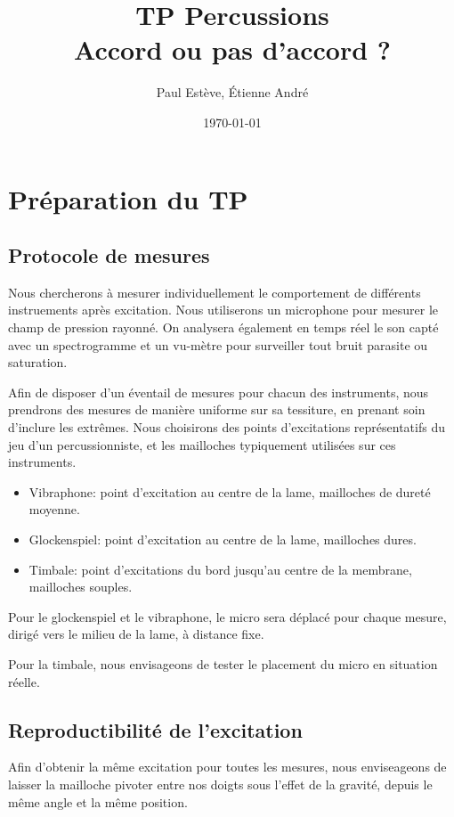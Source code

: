 \documentclass[atiam, article]{rapport} %
\title{TP Percussions\\Accord ou pas d'accord ?}
\author{Paul Estève, Étienne André} %
\date{\today}
\begin{document}
\maketitle

\section{Préparation du TP}

\nocite{chaigne2008acoustique}
\nocite{kinsler2000fundamentals}

\subsection{Protocole de mesures}
Nous chercherons à mesurer individuellement le comportement de différents instruements après excitation. Nous utiliserons un microphone pour mesurer le champ de pression rayonné. On analysera également en temps réel le son capté avec un spectrogramme et un vu-mètre pour surveiller tout bruit parasite ou saturation.

Afin de disposer d'un éventail de mesures pour chacun des instruments, nous prendrons des mesures de manière uniforme sur sa tessiture, en prenant soin d'inclure les extrêmes. Nous choisirons des points d'excitations représentatifs du jeu d'un percussionniste, et les mailloches typiquement utilisées sur ces instruments.

\begin{itemize}
  \item Vibraphone: point d'excitation au centre de la lame, mailloches de dureté moyenne.
  \item Glockenspiel: point d'excitation au centre de la lame, mailloches dures.
  \item Timbale: point d'excitations du bord jusqu'au centre de la membrane, mailloches souples.
\end{itemize}


Pour le glockenspiel et le vibraphone, le micro sera déplacé pour chaque mesure, dirigé vers le milieu de la lame, à distance fixe.

Pour la timbale, nous envisageons de tester le placement du micro en situation réelle.

\subsection{Reproductibilité de l'excitation}
Afin d'obtenir la même excitation pour toutes les mesures, nous enviseageons de laisser la mailloche pivoter entre nos doigts sous l'effet de la gravité, depuis le même angle et la même position.
\end{document}
